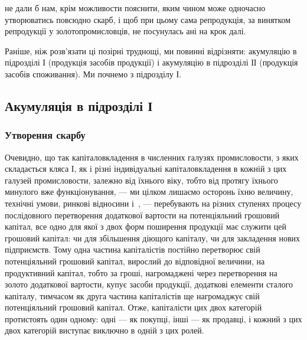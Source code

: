 \parcont{}  %
не дали б нам, крім можливости пояснити, яким чином може одночасно
утворюватись повсюдно скарб, і щоб при цьому сама репродукція, за
винятком репродукції у золотопромисловців, не посунулась ані на
крок далі.

Раніше, ніж розв’язати ці позірні труднощі, ми повинні відрізняти:
акумуляцію в підрозділі І (продукція засобів продукції) і акумуляцію
в підрозділі ІІ (продукція засобів споживання). Ми почнемо з підрозділу
І.

\subsection{Акумуляція в підрозділі І}

\subsubsection{Утворення скарбу}

Очевидно, що так капіталовкладення в численних галузях промисловости,
з яких складається кляса І, як і різні індивідуальні капіталовкладення
в кожній з цих галузей промисловости, залежно від їхнього віку,
тобто від протягу їхнього минулого вже функціонування, — ми цілком
лишаємо осторонь їхню величину, технічні умови, ринкові відносини
і~, — перебувають на різних ступенях процесу послідовного перетворення
додаткової вартости на потенціяльний грошовий капітал, все одно
для якої з двох форм поширення продукції має служити цей грошовий
капітал: чи для збільшення діющого капіталу, чи для закладення нових підприємств.
Тому одна частина капіталістів постійно перетворює свій потенціяльний
грошовий капітал, вирослий до відповідної величини, на продуктивний
капітал, тобто за гроші, нагромаджені через перетворення на
золото додаткової вартости, купує засоби продукції, додаткові елементи
сталого капіталу, тимчасом як друга частина капіталістів ще нагромаджує
свій потенціяльний грошовий капітал. Отже, капіталісти цих двох категорій
протистоять один одному: одні — як покупці, інші — як продавці, і
кожний з цих двох категорій виступає виключно в одній з цих ролей.

